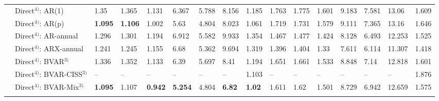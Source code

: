 \begin{table}[!h]
\begin{tabular}{llllllllllllllll}
 & Direct$^{4)}$: AR(1) & 1.35 & 1.365 & 1.131 & 6.367 & 5.788 & 8.156 & 1.185 & 1.763 & 1.775 & 1.601 & 9.183 & 7.581 & 13.06 & 1.609\\
 & Direct$^{4)}$: AR(p) & \textbf{1.095} & \textbf{1.106} & 1.002 & 5.63 & 4.804 & 8.023 & 1.061 & 1.719 & 1.731 & 1.579 & 9.111 & 7.365 & 13.16 & 1.646\\
 & Direct$^{4)}$: AR-annual & 1.296 & 1.301 & 1.194 & 6.912 & 5.582 & 9.933 & 1.354 & 1.467 & 1.477 & 1.424 & 8.128 & 6.493 & 12.253 & 1.525\\
 & Direct$^{4)}$: ARX-annual & 1.241 & 1.245 & 1.155 & 6.68 & 5.362 & 9.694 & 1.319 & 1.396 & 1.404 & 1.33 & 7.611 & 6.114 & 11.307 & 1.418\\
 & Direct$^{4)}$: BVAR$^{3)}$ & 1.336 & 1.352 & 1.133 & 6.39 & 5.697 & 8.41 & 1.194 & 1.651 & 1.661 & 1.533 & 8.848 & 7.14 & 12.818 & 1.601\\
 & Direct$^{4)}$: BVAR-CISS$^{3)}$ & -- & -- & -- & -- & -- & -- & 1.103 & -- & -- & -- & -- & -- & -- & 1.876\\
 & Direct$^{4)}$: BVAR-Mix$^{3)}$ & \textbf{1.095} & 1.107 & \textbf{0.942} & \textbf{5.254} & 4.804 & \textbf{6.82} & \textbf{1.02} & 1.611 & 1.62 & 1.501 & 8.729 & 6.942 & 12.659 & 1.575\\
\cellcolor{gray!15}{} & \cellcolor{gray!15}{Simple Ensemble$^{5)}$} & \cellcolor{gray!15}{1.18} & \cellcolor{gray!15}{1.196} & \cellcolor{gray!15}{0.993} & \cellcolor{gray!15}{5.617} & \cellcolor{gray!15}{5.072} & \cellcolor{gray!15}{7.168} & \cellcolor{gray!15}{1.069} & \cellcolor{gray!15}{1.509} & \cellcolor{gray!15}{1.53} & \cellcolor{gray!15}{1.403} & \cellcolor{gray!15}{8.122} & \cellcolor{gray!15}{6.436} & \cellcolor{gray!15}{11.922} & \cellcolor{gray!15}{1.455}\\
\bottomrule
\end{tabular}
\end{table}
